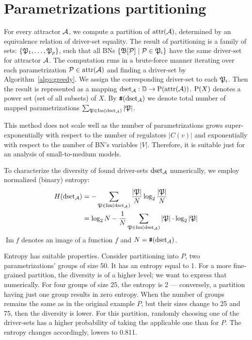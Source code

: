 \documentclass[
	digital, oneside, nosansbold, nocolorbold, nolot, nolof
]{fithesis4}
\theoremstyle{definition}
\theoremstyle{definition}
\DeclareMathOperator{\attrf}{attr}
\DeclareMathOperator{\im}{Im}
\DeclarePairedDelimiter{\set}{\{}{\}}
\begin{document}
\section{Parametrizations partitioning}

For every attractor $\mathcal{A}$, we compute a partition of
$\attrf(\attr{A})$, determined by an equivalence relation of
driver-set equality. The result of partitioning is a family of sets:
$\set{\paronset{P}_1, \ldots, \paronset{P}_p}$, such that all BNs
$\set{\PBN{B}[\paron{P}] \mid \paron{P} \in \paronset{P}_i}$ have the same
driver-set for attractor $\mathcal{A}$. The computation runs in a brute-force
manner iterating over each parametrization $\paron{P} \in
\attrf(\attr{A})$ and finding a driver-set by
Algorithm~\ref{algo:greedy}. We assign the corresponding driver-set to each
$\mathfrak{P}_i$. Then the result is represented as a mapping $\dsetfmacro{A}:
\dsetsp \to \pset{\attrf(\attr{A})}$. $\mathrm{P}(X)$ denotes a power set (set of
all subsets) of $X$. By $\texttt{\#}(\operatorname{dset}_{\mathcal{A}})$ we denote total number of mapped
parametrizations $\sum_{\paronset{P} \in \im(\dsetfmacro{A})} |\paronset{P}|$.

This method does not scale well as the number of
parametrizations grows super-exponentially with respect to the number of
regulators $|C(v)|$ and exponentially with respect to the number of BN's
variables $|V|$. Therefore, it is suitable just for an analysis of
small-to-medium models.

To characterize the diversity of found driver-sets $\operatorname{dset}_{\mathcal{A}}$
numerically, we employ normalized (binary) entropy:
\begin{align} \label{formula:entropy}
    H(\dsetfmacro{A})
    &= - \sum_{\paronset{P} \in \im(\dsetfmacro{A})}
        \frac{|\paronset{P}|}{N} \log_2 \frac{|\paronset{P}|}{N} \\
    &= \log_2 N - \frac{1}{N} \sum_{\paronset{P} \in \im(\dsetfmacro{A})}
        |\paronset{P}| \cdot \log_2 |\paronset{P}| \nonumber
\end{align}
$\im{f}$ denotes an image of a function $f$ and $N = \texttt{\#}(\operatorname{dset}_{\mathcal{A}})$.

Entropy has suitable properties. Consider partitioning into $P$, two
parametrizations' groups of size 50. It has an entropy equal to 1. For a more
fine-grained partition, the diversity is of a higher level; we want to express
that numerically. For four groups of size 25, the entropy is 2 --- conversely,
a partition having just one group results in zero entropy. When the number of
groups remains the same as in the original example $P$, but their sizes change
to 25 and 75, then the diversity is lower. For this partition, randomly
choosing one of the driver-sets has a higher probability of taking the
applicable one than for $P$. The entropy changes accordingly, lowers to 0.811.
\end{document}
